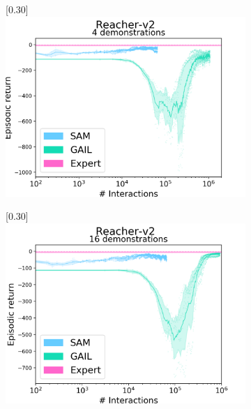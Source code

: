 \begin{figure}
\begin{subfigure}[t]{0.49\textwidth}
    \center\scalebox{0.30}[0.30]{\includegraphics{Plots/sam_gail_Reacher_s0-1-2-3_d4_results_log}}
  \end{subfigure}
  \begin{subfigure}[t]{0.49\textwidth}
    \center\scalebox{0.30}[0.30]{\includegraphics{Plots/sam_gail_Reacher_s0-1-2-3_d16_results_log}}
  \end{subfigure}
  \begin{subfigure}[t]{0.49\textwidth}

\end{subfigure}
\end{figure}
